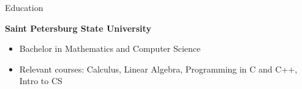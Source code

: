 \documentclass{resume} %
\begin{document}





\begin{rSection}{Education}

{\bf Saint Petersburg State University}  %
\begin{itemize}
    \item Bachelor in Mathematics and Computer Science %
    \item Relevant courses: Calculus, Linear Algebra, Programming in C and C++, Intro to CS
\end{itemize}





\end{rSection}
\end{document}
